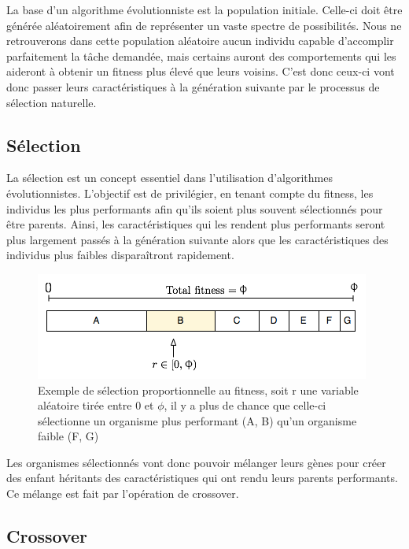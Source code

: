 \documentclass{article}
\begin{document}
La base d'un algorithme évolutionniste est la population initiale. Celle-ci doit être générée aléatoirement afin de représenter un vaste spectre de possibilités. 
Nous ne retrouverons dans cette population aléatoire aucun individu capable d'accomplir parfaitement la tâche demandée, mais certains auront des comportements qui les aideront à obtenir un fitness plus élevé que leurs voisins. C'est donc ceux-ci vont donc passer leurs caractéristiques à la génération suivante par le processus de sélection naturelle.

\subsection{Sélection}

La sélection est un concept essentiel dans l'utilisation d'algorithmes évolutionnistes. L'objectif est de privilégier, en tenant compte du fitness, les individus les plus performants afin qu'ils soient plus souvent sélectionnés pour être parents. Ainsi, les caractéristiques qui les rendent plus performants seront plus largement passés à la génération suivante alors que les caractéristiques des individus plus faibles disparaîtront rapidement\cite{wikifps}.

\begin{figure}[H]
\begin{center}
	\includegraphics[scale=0.6]{fps.png} 
	\caption{Exemple de sélection proportionnelle au fitness, soit r une variable aléatoire tirée entre 0 et $\phi$, il y a plus de chance que celle-ci sélectionne un organisme plus performant (A, B) qu'un organisme faible (F, G)\cite{wikifps}}
\end{center}
\end{figure}

Les organismes sélectionnés vont donc pouvoir mélanger leurs gènes pour créer des enfant héritants des caractéristiques qui ont rendu leurs parents performants. Ce mélange est fait par l'opération de crossover.

\subsection{Crossover}
\end{document}
